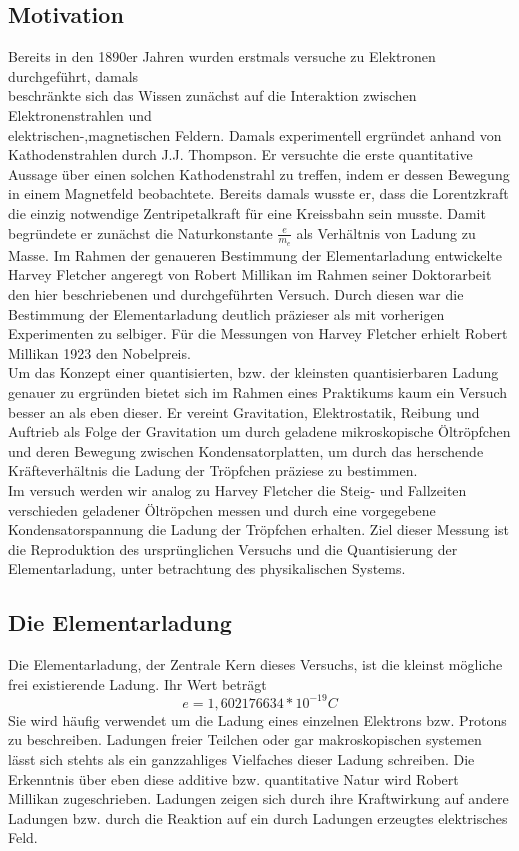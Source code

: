 \documentclass{scrartcl}
\begin{document}
	\subsection{Motivation}
		Bereits in den 1890er Jahren wurden erstmals versuche zu Elektronen durchgeführt, damals\\
		beschränkte sich das Wissen zunächst auf die Interaktion zwischen Elektronenstrahlen und\\ elektrischen-,magnetischen Feldern.
		Damals experimentell ergründet anhand von Kathodenstrahlen durch J.J. Thompson. Er versuchte die erste quantitative Aussage über einen
		solchen Kathodenstrahl zu treffen, indem er dessen Bewegung in einem Magnetfeld beobachtete. Bereits damals
		wusste er, dass die Lorentzkraft die einzig notwendige Zentripetalkraft für eine Kreissbahn sein musste.
		Damit begründete er zunächst die Naturkonstante $\frac{e}{m_e}$ als Verhältnis von Ladung zu Masse.
		Im Rahmen der genaueren Bestimmung der Elementarladung entwickelte Harvey Fletcher angeregt von Robert Millikan im Rahmen
		seiner Doktorarbeit den hier beschriebenen und durchgeführten Versuch. Durch diesen war die Bestimmung
		der Elementarladung deutlich präzieser als mit vorherigen Experimenten zu selbiger.
		Für die Messungen von Harvey Fletcher erhielt Robert Millikan 1923 den Nobelpreis.  
		\\
		Um das Konzept einer quantisierten, bzw. der kleinsten quantisierbaren Ladung genauer
		zu ergründen bietet sich im Rahmen eines Praktikums kaum ein Versuch besser an als eben dieser.
		Er vereint Gravitation, Elektrostatik, Reibung und Auftrieb als Folge der Gravitation um durch
		geladene mikroskopische Öltröpfchen und deren Bewegung zwischen Kondensatorplatten, um durch das
		herschende Kräfteverhältnis die Ladung der Tröpfchen präziese zu bestimmen.
		\\
		Im versuch werden wir analog zu Harvey Fletcher die Steig- und Fallzeiten verschieden geladener
		Öltröpchen messen und durch eine vorgegebene Kondensatorspannung die Ladung der Tröpfchen erhalten.
		Ziel dieser Messung ist die Reproduktion des ursprünglichen Versuchs und die Quantisierung der Elementarladung,
		unter betrachtung des physikalischen Systems.
	\subsection{Die Elementarladung}
		Die Elementarladung, der Zentrale Kern dieses Versuchs, ist die kleinst mögliche frei existierende Ladung. Ihr Wert beträgt
			\begin{equation}
				e = 1,602 176 634 * 10^{-19} C
			\end{equation}
		Sie wird häufig verwendet um die Ladung eines einzelnen Elektrons bzw. Protons zu beschreiben. Ladungen
		freier Teilchen oder gar makroskopischen systemen lässt sich stehts als ein ganzzahliges Vielfaches
		dieser Ladung schreiben. Die Erkenntnis über eben diese additive bzw. quantitative Natur wird Robert Millikan zugeschrieben.
        Ladungen zeigen sich durch ihre Kraftwirkung auf andere Ladungen bzw. durch die Reaktion auf ein durch Ladungen erzeugtes elektrisches Feld.
\end{document}
